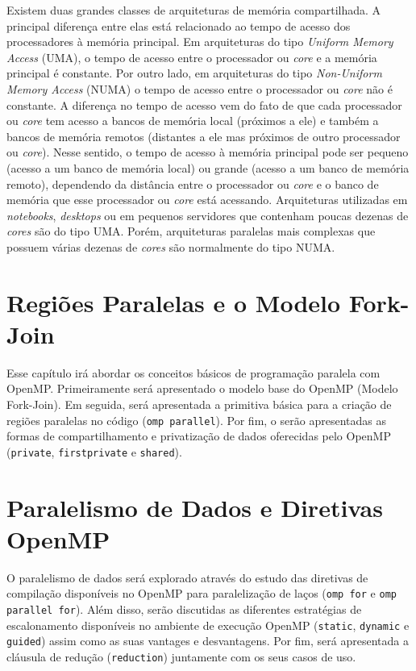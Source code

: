 \documentclass{SBCbookchapter}
\begin{document}
Existem duas grandes classes de arquiteturas de memória compartilhada. A principal diferença entre elas está relacionado ao tempo de acesso dos processadores à memória principal. Em arquiteturas do tipo \textit{Uniform Memory Access} (UMA), o tempo de acesso entre o processador ou \textit{core} e a memória principal é constante. Por outro lado, em arquiteturas do tipo \textit{Non-Uniform Memory Access} (NUMA) o tempo de acesso entre o processador ou \textit{core} não é constante. A diferença no tempo de acesso vem do fato de que cada processador ou \textit{core} tem acesso a bancos de memória local (próximos a ele) e também a bancos de memória remotos (distantes a ele mas próximos de outro processador ou \textit{core}). Nesse sentido, o tempo de acesso à memória principal pode ser pequeno (acesso a um banco de memória local) ou grande (acesso a um banco de memória remoto), dependendo da distância entre o processador ou \textit{core} e o banco de memória que esse processador ou \textit{core} está acessando. Arquiteturas utilizadas em \textit{notebooks}, \textit{desktops} ou em pequenos servidores que contenham poucas dezenas de \textit{cores} são do tipo UMA. Porém, arquiteturas paralelas mais complexas que possuem várias dezenas de \textit{cores} são normalmente do tipo NUMA.

\section{Regiões Paralelas e o Modelo Fork-Join}

Esse capítulo irá abordar os conceitos básicos de programação paralela com OpenMP. Primeiramente será apresentado o modelo base do OpenMP (Modelo Fork-Join). Em seguida, será apresentada a primitiva básica para a criação de regiões paralelas no código (\texttt{omp parallel}). Por fim, o serão apresentadas as formas de compartilhamento e privatização de dados oferecidas pelo OpenMP (\texttt{private}, \texttt{firstprivate} e \texttt{shared}).

\section{Paralelismo de Dados e Diretivas OpenMP}

O paralelismo de dados será explorado através do estudo das diretivas de compilação disponíveis no OpenMP para paralelização de laços (\texttt{omp for} e \texttt{omp parallel for}). Além disso, serão discutidas as diferentes estratégias de escalonamento disponíveis no ambiente de execução OpenMP (\texttt{static}, \texttt{dynamic} e \texttt{guided}) assim como as suas vantages e desvantagens. Por fim, será apresentada a cláusula de redução (\texttt{reduction}) juntamente com os seus casos de uso.
\end{document}
